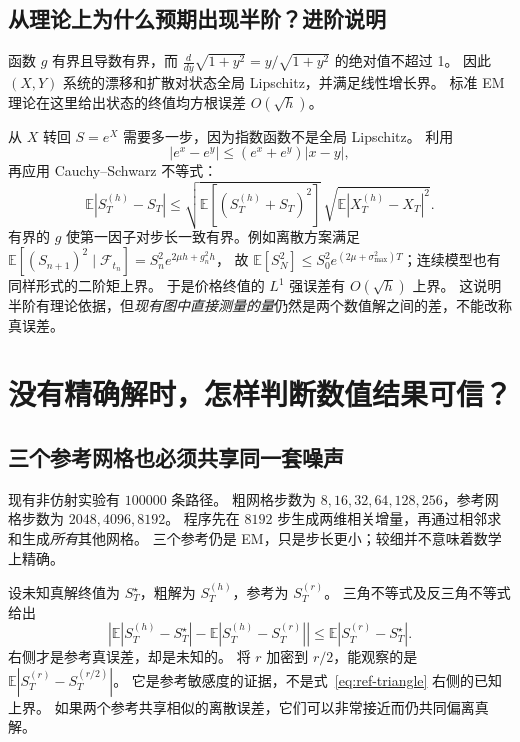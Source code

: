 \documentclass[11pt,a4paper,fontset=none]{ctexart}
\numberwithin{equation}{section}
\newcommand{\E}{\mathbb E}
\begin{document}
\subsection{从理论上为什么预期出现半阶？进阶说明}
函数 $g$ 有界且导数有界，而
$\frac{d}{dy}\sqrt{1+y^2}=y/\sqrt{1+y^2}$ 的绝对值不超过 1。
因此 $(X,Y)$ 系统的漂移和扩散对状态全局 Lipschitz，并满足线性增长界。
标准 EM 理论在这里给出状态的终值均方根误差 $O(\sqrt h)$。

从 $X$ 转回 $S=e^X$ 需要多一步，因为指数函数不是全局 Lipschitz。
利用
\begin{equation}\label{eq:na-exp-error}
 |e^x-e^y|\le(e^x+e^y)|x-y|,
\end{equation}
再应用 Cauchy--Schwarz 不等式：
\begin{equation}\label{eq:na-strong-bound}
 \E|S_T^{(h)}-S_T|
 \le \sqrt{\E[(S_T^{(h)}+S_T)^2]}\,
       \sqrt{\E|X_T^{(h)}-X_T|^2}.
\end{equation}
有界的 $g$ 使第一因子对步长一致有界。例如离散方案满足
$\E[(S_{n+1})^2\mid\mathcal F_{t_n}]=S_n^2e^{2\mu h+g_n^2h}$，
故 $\E[S_N^2]\le S_0^2e^{(2\mu+\sigma_{\max}^2)T}$；连续模型也有同样形式的二阶矩上界。
于是价格终值的 $L^1$ 强误差有 $O(\sqrt h)$ 上界。
这说明半阶有理论依据，但\emph{现有图中直接测量的量}仍然是两个数值解之间的差，不能改称真误差。

\section{没有精确解时，怎样判断数值结果可信？}\label{sec:reference}
\subsection{三个参考网格也必须共享同一套噪声}
现有非仿射实验有 $100000$ 条路径。
粗网格步数为 $8,16,32,64,128,256$，参考网格步数为 $2048,4096,8192$。
程序先在 $8192$ 步生成两维相关增量，再通过相邻求和生成\emph{所有}其他网格。
三个参考仍是 EM，只是步长更小；较细并不意味着数学上精确。

设未知真解终值为 $S_T^\star$，粗解为 $S_T^{(h)}$，参考为 $S_T^{(r)}$。
三角不等式及反三角不等式给出
\begin{equation}\label{eq:ref-triangle}
 \left|\E|S_T^{(h)}-S_T^\star|-\E|S_T^{(h)}-S_T^{(r)}|\right|
 \le\E|S_T^{(r)}-S_T^\star|.
\end{equation}
右侧才是参考真误差，却是未知的。
将 $r$ 加密到 $r/2$，能观察的是 $\E|S_T^{(r)}-S_T^{(r/2)}|$。
它是参考敏感度的证据，不是式~\eqref{eq:ref-triangle} 右侧的已知上界。
如果两个参考共享相似的离散误差，它们可以非常接近而仍共同偏离真解。
\end{document}
